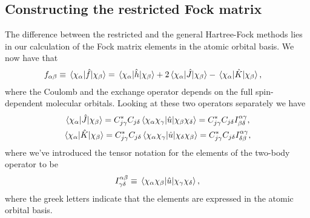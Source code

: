         \subsection{Constructing the restricted Fock matrix}
            The difference between the restricted and the general Hartree-Fock
            methods lies in our calculation of the Fock matrix elements in the
            atomic orbital basis.
            We now have that
            \begin{align}
                f_{\alpha\beta}
                &\equiv \mel*{\chi_{\alpha}}{\hat{f}}{\chi_{\beta}}
                =
                \mel*{\chi_{\alpha}}{\hat{h}}{\chi_{\beta}}
                +
                2
                \mel*{\chi_{\alpha}}{\hat{J}}{\chi_{\beta}}
                -
                \mel*{\chi_{\alpha}}{\hat{K}}{\chi_{\beta}},
            \end{align}
            where the Coulomb and the exchange operator depends on the full
            spin-dependent molecular orbitals.
            Looking at these two operators separately we have
            \begin{gather}
                \mel*{\chi_{\alpha}}{\hat{J}}{\chi_{\beta}}
                =
                C^{*}_{j\gamma} C_{j\delta}
                \mel*{\chi_{\alpha}\chi_{\gamma}}{
                    \hat{u}
                }{\chi_{\beta}\chi_{\delta}}
                =
                C^{*}_{j\gamma} C_{j\delta}
                I^{\alpha\gamma}_{\beta\delta},
                \\
                \mel*{\chi_{\alpha}}{\hat{K}}{\chi_{\beta}}
                =
                C^{*}_{j\gamma} C_{j\delta}
                \mel*{\chi_{\alpha}\chi_{\gamma}}{
                    \hat{u}
                }{\chi_{\delta}\chi_{\beta}}
                =
                C^{*}_{j\gamma} C_{j\delta}
                I^{\alpha\gamma}_{\delta\beta},
            \end{gather}
            where we've introduced the tensor notation for the elements of the
            two-body operator to be
            \begin{align}
                I^{\alpha\beta}_{\gamma\delta}
                \equiv
                \mel*{\chi_{\alpha}\chi_{\beta}}{
                    \hat{u}
                }{\chi_{\gamma}\chi_{\delta}},
            \end{align}
            where the greek letters indicate that the elements are expressed in
            the atomic orbital basis.
